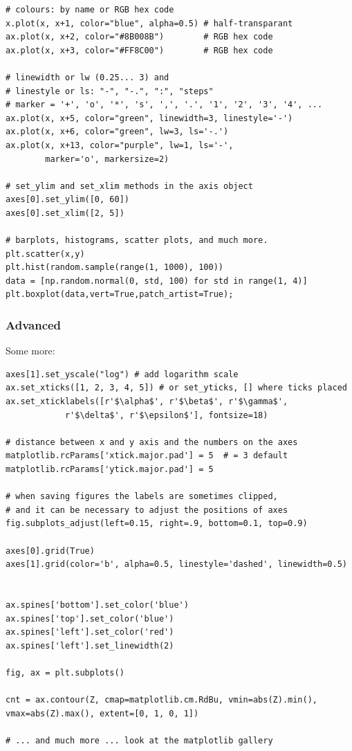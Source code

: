 \documentclass[12pt]{article}
\begin{document}
\begin{lstlisting}
# colours: by name or RGB hex code
x.plot(x, x+1, color="blue", alpha=0.5) # half-transparant
ax.plot(x, x+2, color="#8B008B")        # RGB hex code
ax.plot(x, x+3, color="#FF8C00")        # RGB hex code 

# linewidth or lw (0.25... 3) and 
# linestyle or ls: "-", "-.", ":", "steps"
# marker = '+', 'o', '*', 's', ',', '.', '1', '2', '3', '4', ...
ax.plot(x, x+5, color="green", linewidth=3, linestyle='-')
ax.plot(x, x+6, color="green", lw=3, ls='-.')
ax.plot(x, x+13, color="purple", lw=1, ls='-', 
        marker='o', markersize=2)

# set_ylim and set_xlim methods in the axis object
axes[0].set_ylim([0, 60])
axes[0].set_xlim([2, 5])

# barplots, histograms, scatter plots, and much more.
plt.scatter(x,y)
plt.hist(random.sample(range(1, 1000), 100))
data = [np.random.normal(0, std, 100) for std in range(1, 4)]
plt.boxplot(data,vert=True,patch_artist=True); 
\end{lstlisting}

\subsubsection{Advanced}
Some more:
\begin{lstlisting}
axes[1].set_yscale("log") # add logarithm scale
ax.set_xticks([1, 2, 3, 4, 5]) # or set_yticks, [] where ticks placed
ax.set_xticklabels([r'$\alpha$', r'$\beta$', r'$\gamma$', 
            r'$\delta$', r'$\epsilon$'], fontsize=18)

# distance between x and y axis and the numbers on the axes
matplotlib.rcParams['xtick.major.pad'] = 5  # = 3 default
matplotlib.rcParams['ytick.major.pad'] = 5

# when saving figures the labels are sometimes clipped, 
# and it can be necessary to adjust the positions of axes
fig.subplots_adjust(left=0.15, right=.9, bottom=0.1, top=0.9)

axes[0].grid(True)
axes[1].grid(color='b', alpha=0.5, linestyle='dashed', linewidth=0.5)


ax.spines['bottom'].set_color('blue')
ax.spines['top'].set_color('blue')
ax.spines['left'].set_color('red')
ax.spines['left'].set_linewidth(2)

fig, ax = plt.subplots()

cnt = ax.contour(Z, cmap=matplotlib.cm.RdBu, vmin=abs(Z).min(), vmax=abs(Z).max(), extent=[0, 1, 0, 1])

# ... and much more ... look at the matplotlib gallery
\end{lstlisting}
\end{document}
